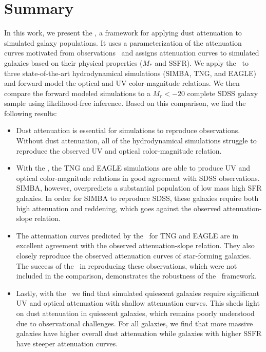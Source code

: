 \section{Summary}
In this work, we present the \eda, a framework for applying dust attenuation to
simulated galaxy populations. It uses a parameterization of 
the attenuation curves motivated from observations~\citep{noll2009} and
assigns attenuation curves to simulated galaxies based on their physical properties ($M_*$ and SSFR).
We apply the \eda~to 
three state-of-the-art hydrodynamical simulations (SIMBA, TNG, and EAGLE) and
forward model the optical and UV color-magnitude relations. We then compare
the forward modeled simulations to a $M_r < -20$ complete SDSS galaxy sample  
using likelihood-free inference. Based on this comparison, we find the
following results: 

\begin{itemize}
    \item Dust attenuation is essential for simulations to reproduce observations.
        Without dust attenuation, all of the hydrodynamical simulations struggle
        to reproduce the observed UV and optical color-magnitude relation. 
    \item With the \eda, the TNG and EAGLE simulations are able to produce UV and
        optical color-magnitude relations in good agreement with SDSS observations. 
        SIMBA, however, overpredicts a substantial population of low mass high
        SFR galaxies. In order for SIMBA to reproduce SDSS, these galaxies require
        both high attenuation and reddening, which goes against the observed 
        attenuation-slope relation. 
    \item The attenuation curves predicted by the \eda~for TNG and EAGLE are in
        excellent agreement with the observed attenuation-slope
        relation. They also closely reproduce the observed attenuation curves
        of star-forming galaxies. The success of the \eda~in reproducing these
        observations, which were not included in the comparison, demonstrates
        the robustness of the \eda~framework. 
    \item Lastly, with the \eda~we find that simulated quiescent galaxies
        require significant UV and optical attenuation with shallow attenuation
        curves. This sheds light on dust attenuation in quiescent galaxies,
        which remains poorly understood due to observational challenges. 
        For all galaxies, we find that more massive galaxies have higher overall dust
        attenuation while galaxies with higher SSFR have steeper attenuation
        curves. 
\end{itemize}

